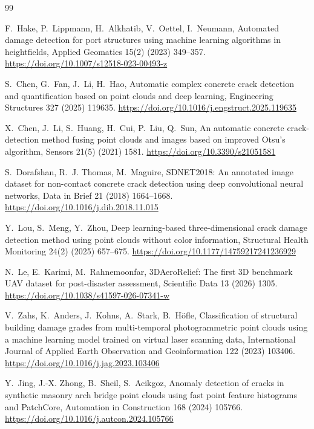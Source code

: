 \documentclass[5p]{elsarticle}
\begin{document}
\begin{thebibliography}{99}

 F.~Hake, P.~Lippmann, H.~Alkhatib, V.~Oettel, I.~Neumann, Automated damage detection for port structures using machine learning algorithms in heightfields, Applied Geomatics 15(2) (2023) 349--357. \url{https://doi.org/10.1007/s12518-023-00493-z}

 S.~Chen, G.~Fan, J.~Li, H.~Hao, Automatic complex concrete crack detection and quantification based on point clouds and deep learning, Engineering Structures 327 (2025) 119635. \url{https://doi.org/10.1016/j.engstruct.2025.119635}

 X.~Chen, J.~Li, S.~Huang, H.~Cui, P.~Liu, Q.~Sun, An automatic concrete crack-detection method fusing point clouds and images based on improved Otsu's algorithm, Sensors 21(5) (2021) 1581. \url{https://doi.org/10.3390/s21051581}

 S.~Dorafshan, R.~J. Thomas, M.~Maguire, SDNET2018: An annotated image dataset for non-contact concrete crack detection using deep convolutional neural networks, Data in Brief 21 (2018) 1664--1668. \url{https://doi.org/10.1016/j.dib.2018.11.015}

 Y.~Lou, S.~Meng, Y.~Zhou, Deep learning-based three-dimensional crack damage detection method using point clouds without color information, Structural Health Monitoring 24(2) (2025) 657--675. \url{https://doi.org/10.1177/14759217241236929}

 N.~Le, E.~Karimi, M.~Rahnemoonfar, 3DAeroRelief: The first 3D benchmark UAV dataset for post-disaster assessment, Scientific Data 13 (2026) 1305. \url{https://doi.org/10.1038/s41597-026-07341-w}

 V.~Zahs, K.~Anders, J.~Kohns, A.~Stark, B.~Höfle, Classification of structural building damage grades from multi-temporal photogrammetric point clouds using a machine learning model trained on virtual laser scanning data, International Journal of Applied Earth Observation and Geoinformation 122 (2023) 103406. \url{https://doi.org/10.1016/j.jag.2023.103406}

 Y.~Jing, J.-X. Zhong, B.~Sheil, S.~Acikgoz, Anomaly detection of cracks in synthetic masonry arch bridge point clouds using fast point feature histograms and PatchCore, Automation in Construction 168 (2024) 105766. \url{https://doi.org/10.1016/j.autcon.2024.105766}


\end{thebibliography}
\end{document}
